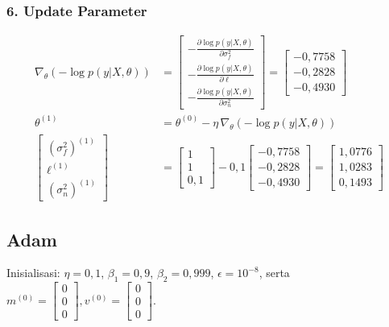 \documentclass[11pt,a4paper]{article}
\def\boldsymbol#1{#1}%
\def\mathbf#1{#1}%
\begin{document}
\subsubsection*{6. Update Parameter}
\begin{align}
\nabla_{\boldsymbol{\theta}} \left( -\log p(\mathbf{y}|X, \boldsymbol{\theta}) \right) &= \begin{bmatrix} -\frac{\partial \log p(\mathbf{y}|X, \boldsymbol{\theta})}{\partial \sigma_f^2} \\[0.4em] -\frac{\partial \log p(\mathbf{y}|X, \boldsymbol{\theta})}{\partial \ell} \\[0.4em] -\frac{\partial \log p(\mathbf{y}|X, \boldsymbol{\theta})}{\partial \sigma_n^2} \end{bmatrix} = \begin{bmatrix} -0{,}7758 \\ -0{,}2828 \\ -0{,}4930 \end{bmatrix} \\
\boldsymbol{\theta}^{(1)} &= \boldsymbol{\theta}^{(0)} - \eta \, \nabla_{\boldsymbol{\theta}} \left( -\log p(\mathbf{y}|X, \boldsymbol{\theta}) \right) \\
\begin{bmatrix} (\sigma_f^2)^{(1)} \\[0.4em] \ell^{(1)} \\[0.4em] (\sigma_n^2)^{(1)} \end{bmatrix} &= \begin{bmatrix} 1 \\ 1 \\ 0{,}1 \end{bmatrix} - 0{,}1 \begin{bmatrix} -0{,}7758 \\ -0{,}2828 \\ -0{,}4930 \end{bmatrix} = \begin{bmatrix} 1{,}0776 \\ 1{,}0283 \\ 0{,}1493 \end{bmatrix}
\end{align}

\subsection{Adam}
\label{subsec:adam}
\noindent Inisialisasi: $\eta = 0{,}1$, $\beta_1 = 0{,}9$, $\beta_2 = 0{,}999$, $\epsilon = 10^{-8}$, serta $\mathbf{m}^{(0)} = \begin{bmatrix} 0 \\ 0 \\ 0 \end{bmatrix}, \mathbf{v}^{(0)} = \begin{bmatrix} 0 \\ 0 \\ 0 \end{bmatrix}$.
\end{document}
